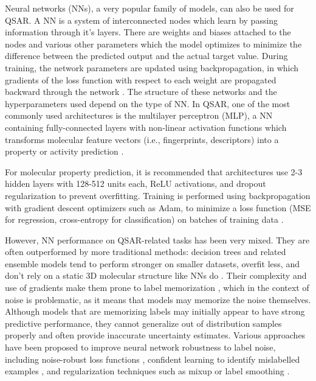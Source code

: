 Neural networks (NNs), a very popular family of models, can also be used for QSAR. A NN is a system of interconnected nodes which learn by passing information through it's layers. There are weights and biases attached to the nodes and various other parameters which the model optimizes to minimize the difference between the predicted output and the actual target value. During training, the network parameters are updated using backpropagation, in which gradients of the loss function with respect to each weight are propagated backward through the network \citep{Hornik1989}. The structure of these networks and the hyperparameters used depend on the type of NN. In QSAR, one of the most commonly used architectures is the multilayer perceptron (MLP), a NN containing fully-connected layers with non-linear activation functions which transforms molecular feature vectors (i.e., fingerprints, descriptors) into a property or activity prediction \citep{Ma2015}.

For molecular property prediction, it is recommended that architectures use 2-3 hidden layers with 128-512 units each, ReLU activations, and dropout regularization to prevent overfitting. Training is performed using backpropagation with gradient descent optimizers such as Adam, to minimize a loss function (MSE for regression, cross-entropy for classification) on batches of training data \citep{wu2018}. 

However, NN performance on QSAR-related tasks has been very mixed. They are often outperformed by more traditional methods: decision trees and related ensemble models tend to perform stronger on smaller datasets, overfit less, and don't rely on a static 3D molecular structure like NNs do \citep{Baskin2008, Koutsoukas2017}. Their complexity and use of gradients make them prone to label memorization \citep{Zhang2017}, which in the context of noise is problematic, as it means that models may memorize the noise themselves. Although models that are memorizing labels may initially appear to have strong predictive performance, they cannot generalize out of distribution samples properly and often provide inaccurate uncertainty estimates. Various approaches have been proposed to improve neural network robustness to label noise, including noise-robust loss functions \citep{Zhang2017}, confident learning to identify mislabelled examples \citep{Northcutt2021}, and regularization techniques such as mixup or label smoothing \citep{Zhang2017}. 

